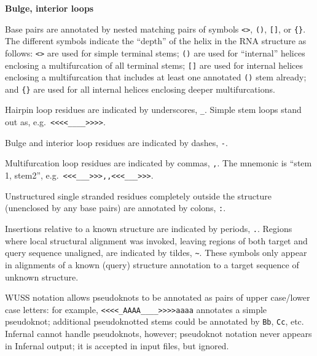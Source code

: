 \begin{sreitems}{\textbf{Bulge, interior loops}}
\item[\textbf{Base pairs}]
  Base pairs are annotated by nested matching pairs of symbols
  \verb+<>+, \verb+()+, \verb+[]+, or \verb+{}+.
  The different symbols indicate the ``depth'' of the
  helix in the RNA structure as follows:
  \verb+<>+ are used for simple terminal stems; 
  \verb+()+ are used for ``internal'' helices enclosing a multifurcation of
  all terminal stems; \verb+[]+ are used for internal helices 
  enclosing a multifurcation that includes at least one annotated
  \verb+()+ stem already; and \verb+{}+ are used for all internal
  helices enclosing deeper multifurcations.
   
\item[\textbf{Hairpin loops}]
  Hairpin loop residues are indicated by underscores, \verb+_+.
  Simple stem loops stand out as, e.g.\ \verb+<<<<____>>>>+.

\item[\textbf{Bulge, interior loops}]
  Bulge and interior loop residues are indicated by dashes, \verb+-+.
  
\item[\textbf{Multifurcation loops}]
  Multifurcation loop residues are indicated by commas, \verb+,+.
  The mnemonic is ``stem 1, stem2'', e.g.\ \verb+<<<___>>>,,<<<___>>>+.

\item[\textbf{External residues}]
  Unstructured single stranded residues completely outside the
  structure (unenclosed by any base pairs) are annotated by
  colons, \verb+:+.

\item[\textbf{Insertions}]
  Insertions relative to a known structure are indicated by periods,
  \verb+.+. Regions where local structural alignment was invoked,
  leaving regions of both target and query sequence unaligned,
  are indicated by tildes, \verb+~+. These symbols only appear in
  alignments of a known (query) structure annotation to a target
  sequence of unknown structure.

\item[\textbf{Pseudoknots}]
  WUSS notation allows pseudoknots to be annotated as pairs of
  upper case/lower case letters: for example,
  \verb+<<<<_AAAA____>>>>aaaa+ annotates a simple pseudoknot;
  additional pseudoknotted stems could be annotated by \verb+Bb+,
  \verb+Cc+, etc. Infernal cannot handle pseudoknots, however;
  pseudoknot notation never appears in Infernal output; it
  is accepted in input files, but ignored.
\end{sreitems}

